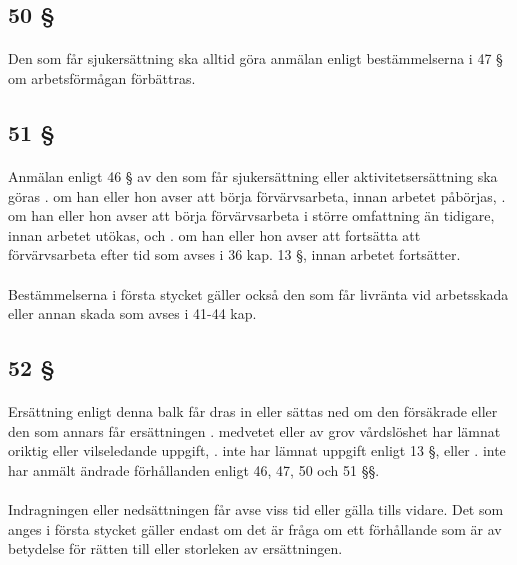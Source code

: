 \documentclass[a4paper,notitlepage,openany,10pt]{book}
\begin{document}
\subsection*{50 §}
\paragraph*{}
Den som får sjukersättning ska alltid göra anmälan enligt bestämmelserna i 47 § om arbetsförmågan förbättras.
\subsection*{51 §}
\paragraph*{}
Anmälan enligt 46 § av den som får sjukersättning eller aktivitetsersättning ska göras
. om han eller hon avser att börja förvärvsarbeta, innan arbetet påbörjas,
. om han eller hon avser att börja förvärvsarbeta i större omfattning än tidigare, innan arbetet utökas, och
. om han eller hon avser att fortsätta att förvärvsarbeta efter tid som avses i 36 kap. 13 §, innan arbetet fortsätter.
\paragraph*{}
Bestämmelserna i första stycket gäller också den som får livränta vid arbetsskada eller annan skada som avses i 41-44 kap.
\subsection*{52 §}
\paragraph*{}
Ersättning enligt denna balk får dras in eller sättas ned om den försäkrade eller den som annars får ersättningen
. medvetet eller av grov vårdslöshet har lämnat oriktig eller vilseledande uppgift,
. inte har lämnat uppgift enligt 13 §, eller
. inte har anmält ändrade förhållanden enligt 46, 47, 50 och 51 §§.
\paragraph*{}
Indragningen eller nedsättningen får avse viss tid eller gälla tills vidare. Det som anges i första stycket gäller endast om det är fråga om ett förhållande som är av betydelse för rätten till eller storleken av ersättningen.
\end{document}
